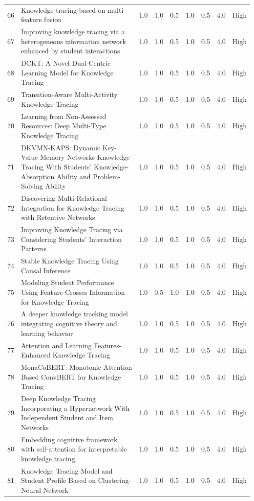 \documentclass{article}
\begin{document}
\begin{longtable}{p{1cm}p{8cm}p{1cm}p{1cm}p{1cm}p{1cm}p{1cm}p{1.5cm}p{1.5cm}}
66 & Knowledge tracing based on multi-feature fusion & 1.0 & 1.0 & 0.5 & 1.0 & 0.5 & 4.0 & High \\
67 & Improving knowledge tracing via a heterogeneous information network enhanced by student interactions & 1.0 & 1.0 & 0.5 & 1.0 & 0.5 & 4.0 & High \\
68 & DCKT: A Novel Dual-Centric Learning Model for Knowledge Tracing & 1.0 & 1.0 & 0.5 & 1.0 & 0.5 & 4.0 & High \\
69 & Transition-Aware Multi-Activity Knowledge Tracing & 1.0 & 1.0 & 0.5 & 1.0 & 0.5 & 4.0 & High \\
70 & Learning from Non-Assessed Resources: Deep Multi-Type Knowledge Tracing & 1.0 & 1.0 & 0.5 & 1.0 & 0.5 & 4.0 & High \\
71 & DKVMN-KAPS: Dynamic Key-Value Memory Networks Knowledge Tracing With Students' Knowledge-Absorption Ability and Problem-Solving Ability & 1.0 & 1.0 & 0.5 & 1.0 & 0.5 & 4.0 & High \\
72 & Discovering Multi-Relational Integration for Knowledge Tracing with Retentive Networks & 1.0 & 1.0 & 0.5 & 1.0 & 0.5 & 4.0 & High \\
73 & Improving Knowledge Tracing via Considering Students' Interaction Patterns & 1.0 & 1.0 & 0.5 & 1.0 & 0.5 & 4.0 & High \\
74 & Stable Knowledge Tracing Using Causal Inference & 1.0 & 1.0 & 0.5 & 1.0 & 0.5 & 4.0 & High \\
75 & Modeling Student Performance Using Feature Crosses Information for Knowledge Tracing & 1.0 & 0.5 & 1.0 & 1.0 & 0.5 & 4.0 & High \\
76 & A deeper knowledge tracking model integrating cognitive theory and learning behavior & 1.0 & 1.0 & 0.5 & 1.0 & 0.5 & 4.0 & High \\
77 & Attention and Learning Features-Enhanced Knowledge Tracing & 1.0 & 1.0 & 0.5 & 1.0 & 0.5 & 4.0 & High \\
78 & MonaCoBERT: Monotonic Attention Based ConvBERT for Knowledge Tracing & 1.0 & 1.0 & 0.5 & 1.0 & 0.5 & 4.0 & High \\
79 & Deep Knowledge Tracing Incorporating a Hypernetwork With Independent Student and Item Networks & 1.0 & 1.0 & 0.5 & 1.0 & 0.5 & 4.0 & High \\
80 & Embedding cognitive framework with self-attention for interpretable knowledge tracing & 1.0 & 1.0 & 0.5 & 1.0 & 0.5 & 4.0 & High \\
81 & Knowledge Tracing Model and Student Profile Based on Clustering-Neural-Network & 1.0 & 1.0 & 0.5 & 1.0 & 0.5 & 4.0 & High \\

\end{longtable}
\end{document}
